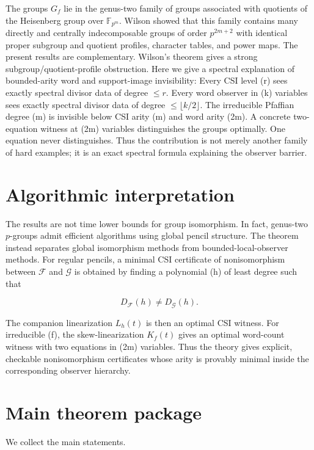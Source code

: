 \documentclass[11pt]{article}
\begin{document}
The groups $G_f$ lie in the genus-two family of groups associated with quotients of the Heisenberg group over $\mathbb F_{p^m}$. Wilson showed that this family contains many directly and centrally indecomposable groups of order $p^{2m+2}$ with identical proper subgroup and quotient profiles, character tables, and power maps. The present results are complementary. Wilson's theorem gives a strong subgroup/quotient-profile obstruction. Here we give a spectral explanation of bounded-arity word and support-image invisibility: Every CSI level (r) sees exactly spectral divisor data of degree $\le r$. Every word observer in (k) variables sees exactly spectral divisor data of degree $\le\lfloor k/2\rfloor$. The irreducible Pfaffian degree (m) is invisible below CSI arity (m) and word arity (2m). A concrete two-equation witness at (2m) variables distinguishes the groups optimally. One equation never distinguishes. Thus the contribution is not merely another family of hard examples; it is an exact spectral formula explaining the observer barrier.

\section{Algorithmic interpretation}

The results are not time lower bounds for group isomorphism. In fact, genus-two $p$-groups admit efficient algorithms using global pencil structure. The theorem instead separates global isomorphism methods from bounded-local-observer methods. For regular pencils, a minimal CSI certificate of nonisomorphism between $\mathcal F$ and $\mathcal G$ is obtained by finding a polynomial (h) of least degree such that

\[
D_{\mathcal F}(h)\ne D_{\mathcal G}(h).
\]

The companion linearization $L_h(t)$ is then an optimal CSI witness. For irreducible (f), the skew-linearization $K_f(t)$ gives an optimal word-count witness with two equations in (2m) variables. Thus the theory gives explicit, checkable nonisomorphism certificates whose arity is provably minimal inside the corresponding observer hierarchy.

\section{Main theorem package}

We collect the main statements.
\end{document}

